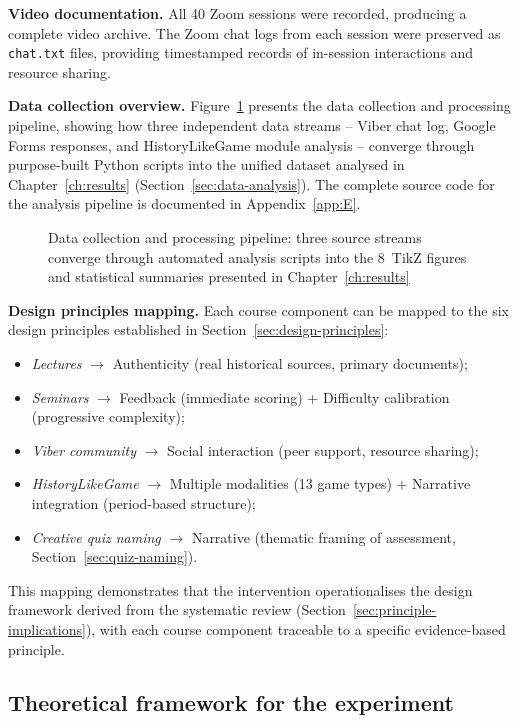 \textbf{Video documentation.} All 40 Zoom sessions were recorded, producing a complete video archive. The Zoom chat logs from each session were preserved as \texttt{chat.txt} files, providing timestamped records of in-session interactions and resource sharing.

\textbf{Data collection overview.} Figure~\ref{fig:data-flow} presents the data collection and processing pipeline, showing how three independent data streams -- Viber chat log, Google Forms responses, and HistoryLikeGame module analysis -- converge through purpose-built Python scripts into the unified dataset analysed in Chapter~\ref{ch:results} (Section~\ref{sec:data-analysis}). The complete source code for the analysis pipeline is documented in Appendix~\ref{app:E}.

\begin{figure}[!h]
\centering
\resizebox{0.95\textwidth}{!}{%
%
}
\caption{Data collection and processing pipeline: three source streams converge through automated analysis scripts into the 8~TikZ figures and statistical summaries presented in Chapter~\ref{ch:results}}
\label{fig:data-flow}
\end{figure}

\textbf{Design principles mapping.} Each course component can be mapped to the six design principles established in Section~\ref{sec:design-principles}:
\begin{itemize}
\item \emph{Lectures} $\to$ Authenticity (real historical sources, primary documents);
\item \emph{Seminars} $\to$ Feedback (immediate scoring) + Difficulty calibration (progressive complexity);
\item \emph{Viber community} $\to$ Social interaction (peer support, resource sharing);
\item \emph{HistoryLikeGame} $\to$ Multiple modalities (13 game types) + Narrative integration (period-based structure);
\item \emph{Creative quiz naming} $\to$ Narrative (thematic framing of assessment, Section~\ref{sec:quiz-naming}).
\end{itemize}
This mapping demonstrates that the intervention operationalises the design framework derived from the systematic review (Section~\ref{sec:principle-implications}), with each course component traceable to a specific evidence-based principle.

\subsection{Theoretical framework for the experiment}

